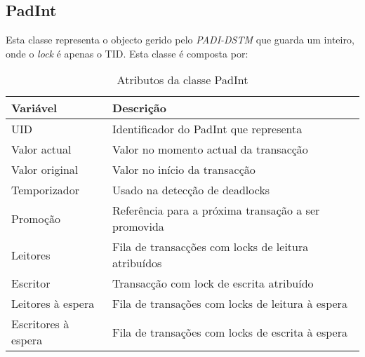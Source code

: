 \subsection{PadInt}

Esta classe representa o objecto gerido pelo \textit{PADI-DSTM} que guarda um inteiro, onde o \textit{lock} é apenas o TID. Esta classe é composta por:
\begin{table}[H]
\centering
\begin{tabular}{| p{2cm} | p{} |}
\hline
\textbf{Variável} & \textbf{Descrição} \\
\hline
UID & Identificador do PadInt que representa \\
\hline
Valor actual & Valor no momento actual da transacção \\
\hline
Valor original & Valor no início da transacção \\
\hline
Temporizador & Usado na detecção de deadlocks \\
\hline
Promoção & Referência para a próxima transação a ser promovida\\
\hline
Leitores & Fila de transacções com locks de leitura atribuídos \\
\hline
Escritor & Transacção com lock de escrita atribuído\\
\hline
Leitores à espera & Fila de transações com locks de leitura à espera \\
\hline
Escritores à espera & Fila de transações com locks de escrita à espera\\
\hline
\end{tabular}
\caption{Atributos da classe PadInt}\label{tab:padint}
\end{table}
